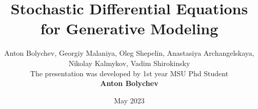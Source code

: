 
\title[%
    SDE for Generative Modeling 
]{%
    Stochastic Differential Equations for Generative Modeling 
}

\author[%
    
]{%
    \small
    Anton Bolychev,
    Georgiy Malaniya,
    Oleg Shepelin,
    Anastasiya Archangelskaya, 
    Nikolay Kalmykov,
    Vadim Shirokinsky
    \\[0.2cm]
    The presentation was developed by 1st year MSU Phd Student\\
    \normalsize
    \textbf{Anton Bolychev}
}

\date[%
    May 2023
]{%
    May 2023
}

